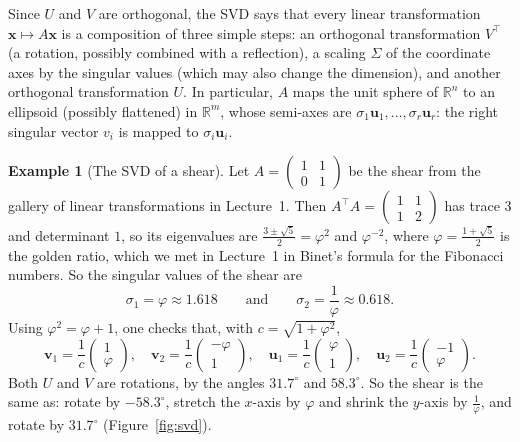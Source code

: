 \documentclass[11pt]{article}
\theoremstyle{definition}
\newtheorem{example}[definition]{Example}
\theoremstyle{plain}
\theoremstyle{remark}
\begin{document}
Since $U$ and $V$ are orthogonal, the SVD says that every linear transformation $\mathbf{x} \mapsto A\mathbf{x}$ is a composition of three simple steps: an orthogonal transformation $V^\top$ (a rotation, possibly combined with a reflection), a scaling $\Sigma$ of the coordinate axes by the singular values (which may also change the dimension), and another orthogonal transformation $U$. In particular, $A$ maps the unit sphere of $\mathbb{R}^n$ to an ellipsoid (possibly flattened) in $\mathbb{R}^m$, whose semi-axes are $\sigma_1 \mathbf{u}_1, \ldots, \sigma_r \mathbf{u}_r$: the right singular vector $v_i$ is mapped to $\sigma_i \mathbf{u}_i$.

\begin{example}[The SVD of a shear]\label{ex:svd-shear}
    Let $A = \begin{pmatrix} 1 & 1 \\ 0 & 1 \end{pmatrix}$ be the shear from the gallery of linear transformations in Lecture~1. Then $A^\top A = \begin{pmatrix} 1 & 1 \\ 1 & 2 \end{pmatrix}$ has trace $3$ and determinant $1$, so its eigenvalues are $\frac{3 \pm \sqrt{5}}{2} = \varphi^2$ and $\varphi^{-2}$, where $\varphi = \frac{1 + \sqrt{5}}{2}$ is the golden ratio, which we met in Lecture~1 in Binet's formula for the Fibonacci numbers. So the singular values of the shear are
    \[\sigma_1 = \varphi \approx 1.618 \qquad \text{and} \qquad \sigma_2 = \frac{1}{\varphi} \approx 0.618.\]
    Using $\varphi^2 = \varphi + 1$, one checks that, with $c = \sqrt{1 + \varphi^2}$,
    \[\mathbf{v}_1 = \frac{1}{c}\begin{pmatrix} 1 \\ \varphi \end{pmatrix}, \quad \mathbf{v}_2 = \frac{1}{c}\begin{pmatrix} -\varphi \\ 1 \end{pmatrix}, \quad \mathbf{u}_1 = \frac{1}{c}\begin{pmatrix} \varphi \\ 1 \end{pmatrix}, \quad \mathbf{u}_2 = \frac{1}{c}\begin{pmatrix} -1 \\ \varphi \end{pmatrix}.\]
    Both $U$ and $V$ are rotations, by the angles $31.7^\circ$ and $58.3^\circ$. So the shear is the same as: rotate by $-58.3^\circ$, stretch the $x$-axis by $\varphi$ and shrink the $y$-axis by $\frac{1}{\varphi}$, and rotate by $31.7^\circ$ (Figure~\ref{fig:svd}).
\end{example}
\end{document}

